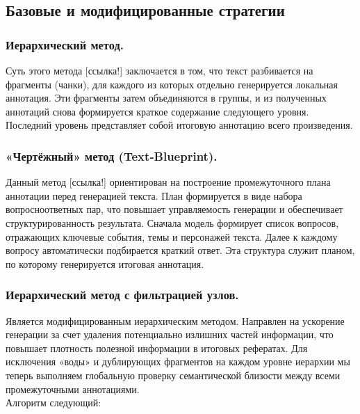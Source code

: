 \documentclass{article}
\theoremstyle{definition}
\theoremstyle{plain}
\begin{document}
\subsection*{Базовые и модифицированные стратегии}

\subsubsection*{Иерархический метод.}
Суть этого метода [ссылка!] заключается в том, что текст разбивается на фрагменты (чанки), для каждого из
которых отдельно генерируется локальная аннотация. 
Эти фрагменты затем объединяются в группы, и из полученных аннотаций снова формируется краткое содержание
следующего уровня. Последний уровень представляет собой итоговую аннотацию всего произведения.

\subsubsection*{«Чертёжный» метод (Text‑Blueprint).}
Данный метод [ссылка!] ориентирован на построение промежуточного
плана аннотации перед генерацией текста. План формируется в виде набора вопросноответных пар, что повышает управляемость генерации и обеспечивает структурированность результата.
Сначала модель формирует список вопросов, отражающих ключевые события, темы
и персонажей текста. Далее к каждому вопросу автоматически подбирается краткий
ответ. Эта структура служит планом, по которому генерируется итоговая аннотация.

\subsubsection*{Иерархический метод с фильтрацией узлов.}
Является модифицированным иерархическим методом. Направлен на ускорение генерации за счет удаления потенциально излишних частей информации, что повышает плотность полезной информации в итоговых рефератах. 
Для исключения «воды» и дублирующих фрагментов на каждом уровне иерархии мы теперь выполняем глобальную проверку семантической близости между всеми промежуточными аннотациями. 
\\Алгоритм следующий:
\end{document}
